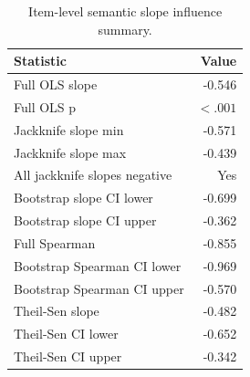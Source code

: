 \begin{table}[htbp]
\centering
\caption{Item-level semantic slope influence summary.}
\label{tab:item-slope-influence-summary}
\begin{tabular}{lr}
\toprule
Statistic & Value \\
\midrule
Full OLS slope & -0.546 \\
Full OLS p & $<.001$ \\
Jackknife slope min & -0.571 \\
Jackknife slope max & -0.439 \\
All jackknife slopes negative & Yes \\
Bootstrap slope CI lower & -0.699 \\
Bootstrap slope CI upper & -0.362 \\
Full Spearman & -0.855 \\
Bootstrap Spearman CI lower & -0.969 \\
Bootstrap Spearman CI upper & -0.570 \\
Theil-Sen slope & -0.482 \\
Theil-Sen CI lower & -0.652 \\
Theil-Sen CI upper & -0.342 \\
\bottomrule
\end{tabular}
\end{table}
